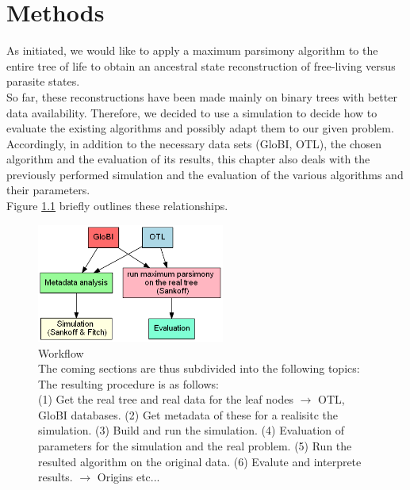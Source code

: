 \chapter{Methods}
  As initiated, we would like to apply a maximum parsimony algorithm to the entire tree of life to 
    obtain an ancestral state reconstruction of free-living versus parasite states. \\
  So far, these reconstructions have been made mainly on binary trees with better data availability. 
    Therefore, we decided to use a simulation to decide how to evaluate the existing algorithms and 
    possibly adapt them to our given problem. \\
  Accordingly, in addition to the necessary data sets (GloBI, OTL), the chosen algorithm and the 
    evaluation of its results, this chapter also deals with the previously performed simulation and 
    the evaluation of the various algorithms and their parameters. \\
  Figure \ref{fig:workflow} briefly outlines these relationships.
  \begin{figure}[h!]
    \centering
    \includegraphics[width=0.55\textwidth]{Figures/Workflow-overview.png}
    \caption{Workflow \\
      The coming sections are thus subdivided into the following topics: \\
       The resulting procedure is as follows: \\
      (1) Get the real tree and real data for the leaf nodes $\rightarrow$ OTL, GloBI databases.
      (2) Get metadata of these for a realisitc the simulation.
      (3) Build and run the simulation.
      (4) Evaluation of parameters for the simulation and the real problem.
      (5) Run the resulted algorithm on the original data.
      (6) Evalute and interprete results. $\rightarrow$ Origins etc...
    }
    \label{fig:workflow}
  \end{figure}

